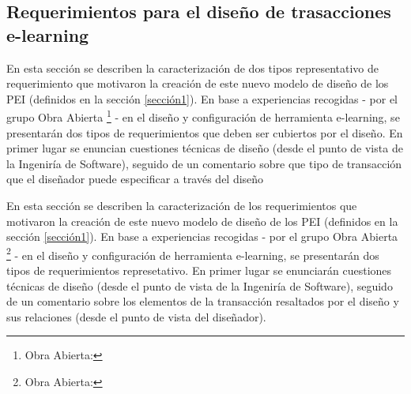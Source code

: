 \documentclass{llncs}
\begin{document}
\subsection{Requerimientos para el diseño de trasacciones e-learning}

En esta sección se describen la caracterización de dos tipos representativo de requerimiento que motivaron la creación de este nuevo modelo de diseño de los PEI (definidos en la sección \ref{sección1}). En base a experiencias recogidas - por el grupo Obra Abierta \footnote{Obra Abierta: } -  en el diseño y configuración de herramienta e-learning, se presentarán dos tipos de requerimientos que deben ser cubiertos por el diseño. En primer lugar se enuncian cuestiones técnicas de diseño (desde el punto de vista de la Ingeniría de Software), seguido de un comentario sobre que tipo de transacción que el diseñador puede especificar a través del diseño

En esta sección se describen la caracterización de los requerimientos que motivaron la creación de este nuevo modelo de diseño de los PEI (definidos en la sección \ref{sección1}). En base a experiencias recogidas - por el grupo Obra Abierta \footnote{Obra Abierta: } -  en el diseño y configuración de herramienta e-learning, se presentarán dos tipos de requerimientos represetativo. En primer lugar se enunciarán cuestiones técnicas de diseño (desde el punto de vista de la Ingeniría de Software), seguido de un comentario sobre los elementos de la transacción resaltados por el diseño y sus relaciones (desde el punto de vista del diseñador).
\end{document}

